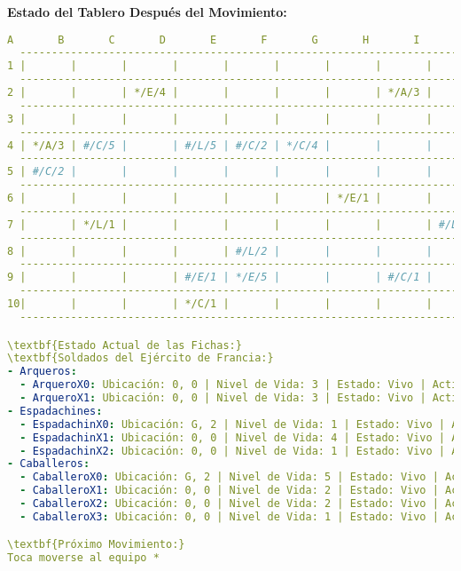 \textbf{Estado del Tablero Después del Movimiento:}
\begin{lstlisting}[language=yaml]
     A       B       C       D       E       F       G       H       I       J
  -------------------------------------------------------------------------------
1 |       |       |       |       |       |       |       |       |       |       |
  -------------------------------------------------------------------------------
2 |       |       | */E/4 |       |       |       |       | */A/3 |       |       |
  -------------------------------------------------------------------------------
3 |       |       |       |       |       |       |       |       |       | #/L/2 |
  -------------------------------------------------------------------------------
4 | */A/3 | #/C/5 |       | #/L/5 | #/C/2 | */C/4 |       |       |       |       |
  -------------------------------------------------------------------------------
5 | #/C/2 |       |       |       |       |       |       |       |       |       |
  -------------------------------------------------------------------------------
6 |       |       |       |       |       |       | */E/1 |       |       |       |
  -------------------------------------------------------------------------------
7 |       | */L/1 |       |       |       |       |       |       | #/L/2 |       |
  -------------------------------------------------------------------------------
8 |       |       |       |       | #/L/2 |       |       |       |       |       |
  -------------------------------------------------------------------------------
9 |       |       |       | #/E/1 | */E/5 |       |       | #/C/1 |       |       |
  -------------------------------------------------------------------------------
10|       |       |       | */C/1 |       |       |       |       |       |       |
  -------------------------------------------------------------------------------

\textbf{Estado Actual de las Fichas:}
\textbf{Soldados del Ejército de Francia:}
- Arqueros:
  - ArqueroX0: Ubicación: 0, 0 | Nivel de Vida: 3 | Estado: Vivo | Actitud: Ataque | Equipo: *
  - ArqueroX1: Ubicación: 0, 0 | Nivel de Vida: 3 | Estado: Vivo | Actitud: Ataque | Equipo: *
- Espadachines:
  - EspadachinX0: Ubicación: G, 2 | Nivel de Vida: 1 | Estado: Vivo | Actitud: Ataque | Equipo: *
  - EspadachinX1: Ubicación: 0, 0 | Nivel de Vida: 4 | Estado: Vivo | Actitud: Ataque | Equipo: *
  - EspadachinX2: Ubicación: 0, 0 | Nivel de Vida: 1 | Estado: Vivo | Actitud: Ataque | Equipo: *
- Caballeros:
  - CaballeroX0: Ubicación: G, 2 | Nivel de Vida: 5 | Estado: Vivo | Actitud: Ataque | Equipo: *
  - CaballeroX1: Ubicación: 0, 0 | Nivel de Vida: 2 | Estado: Vivo | Actitud: Ataque | Equipo: *
  - CaballeroX2: Ubicación: 0, 0 | Nivel de Vida: 2 | Estado: Vivo | Actitud: Ataque | Equipo: *
  - CaballeroX3: Ubicación: 0, 0 | Nivel de Vida: 1 | Estado: Vivo | Actitud: Ataque | Equipo: #

\textbf{Próximo Movimiento:}
Toca moverse al equipo *
\end{lstlisting}

